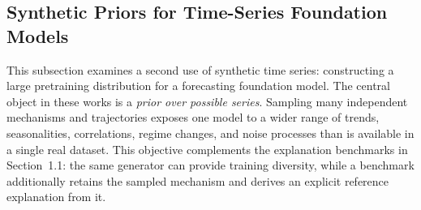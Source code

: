 \subsection{Synthetic Priors for Time-Series Foundation Models}

This subsection examines a second use of synthetic time series: constructing a
large pretraining distribution for a forecasting foundation model. The central
object in these works is a \emph{prior over possible series}. Sampling many
independent mechanisms and trajectories exposes one model to a wider range of
trends, seasonalities, correlations, regime changes, and noise processes than
is available in a single real dataset. This objective complements the
explanation benchmarks in Section~1.1: the same generator can provide training
diversity, while a benchmark additionally retains the sampled mechanism and
derives an explicit reference explanation from it.





